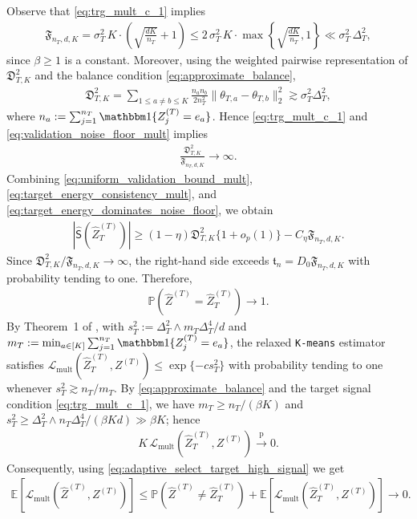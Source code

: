 \documentclass[10pt]{article}
\newcommand{\convp}{\xrightarrow{\mathrm{p}}}
\newcommand{\wh}{\widehat}
\newcommand{\trg}{T}
\newcommand{\nT}{n_{\trg}}
\newcommand{\sigmaT}{\sigma_{\trg}}
\newcommand{\Ztar}{Z^{(\trg)}}
\newcommand{\thetamcT}[1]{\theta_{\trg,#1}}
\newcommand{\DeltaT}{\Delta_{\trg}}
\newcommand{\hatZtar}{\wh{Z}^{(\trg)}}
\begin{document}
Observe that \eqref{eq:trg_mult_c_1} implies
\begin{align}
    \mathfrak F_{\nT,d,K}= \sigmaT^2\,K\cdot\left(\sqrt{\frac{dK}{\nT}}+1\right) \le 2\,\sigmaT^2\,K\cdot\max\left\{\sqrt{\frac{dK}{\nT}},1\right\} \ll \sigmaT^2\,\DeltaT^2,
\end{align}
since $\beta\ge 1$ is a constant. Moreover, using the weighted pairwise representation of
$\mathfrak D_{\trg,K}^2$ and the balance condition \eqref{eq:approximate_balance},
\begin{align}
    \mathfrak D_{\trg,K}^2
    =
    \sum_{1\le a\neq b\le K}\frac{n_a n_b}{2\nT^2}
    \|\thetamcT{a}-\thetamcT{b}\|_2^2
    \gtrsim \sigmaT^2\DeltaT^2,
\end{align}
where $n_a:=\sum_{j=1}^{\nT}\mathbbm 1\{\Ztar_j=e_a\}$. Hence
\eqref{eq:trg_mult_c_1} and \eqref{eq:validation_noise_floor_mult} implies
\begin{align}
\label{eq:target_energy_dominates_noise_floor}
    \frac{\mathfrak D_{\trg,K}^2}{\mathfrak F_{\nT,d,K}}\to\infty.
\end{align}
Combining \eqref{eq:uniform_validation_bound_mult},
\eqref{eq:target_energy_consistency_mult}, and
\eqref{eq:target_energy_dominates_noise_floor}, we obtain
\begin{align}
    |\wh{\mathsf S}(\hatZtar_\trg)|
    \ge (1-\eta)\mathfrak D_{\trg,K}^2\{1+o_p(1)\}-C_\eta\mathfrak F_{\nT,d,K}.
\end{align}
Since $\mathfrak D_{\trg,K}^2/\mathfrak F_{\nT,d,K}\to\infty$, the right-hand
side exceeds $\mathfrak t_n=D_0\mathfrak F_{\nT,d,K}$ with probability tending
to one. Therefore,
\begin{align}
\label{eq:adaptive_select_target_high_signal}
    \mathbb P\left(\hatZtar=\hatZtar_\trg\right)\to1.
\end{align}
By Theorem~1 of \citet{giraud2019partial}, with
$s_{\trg}^2:=\DeltaT^2\wedge m_{\trg}\DeltaT^4/d$ and
$m_{\trg}:=\min_{a\in[K]}\sum_{j=1}^{\nT}\mathbbm 1\{\Ztar_j=e_a\}$, the
relaxed \texttt{K-means} estimator satisfies
$\mathcal L_{\mathrm{mult}}(\hatZtar_\trg,\Ztar)\le \exp\{-c s_{\trg}^2\}$
with probability tending to one whenever $s_{\trg}^2\gtrsim \nT/m_{\trg}$.
By \eqref{eq:approximate_balance} and the target signal condition \eqref{eq:trg_mult_c_1}, we have
$m_{\trg}\ge \nT/(\beta K)$ and
$s_{\trg}^2\ge \DeltaT^2\wedge \nT\DeltaT^4/(\beta Kd)\gg \beta K$; hence
\begin{align}
\label{eq:target_k_loss_vanish}
    K\,\mathcal L_{\mathrm{mult}}(\hatZtar_\trg,\Ztar)\convp0.
\end{align}
Consequently, using \eqref{eq:adaptive_select_target_high_signal} we get 
\begin{align}
    \mathbb E\left[\mathcal L_{\mathrm{mult}}(\hatZtar,\Ztar)\right]
    \le \mathbb P(\hatZtar\neq\hatZtar_\trg)
    +\mathbb E\left[\mathcal L_{\mathrm{mult}}(\hatZtar_\trg,\Ztar)\right]\to0.
\end{align}
\end{document}
